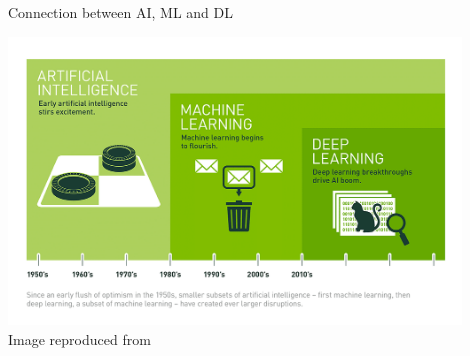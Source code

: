 \begin{frame}{Connection between AI, ML and DL}

    \begin{center}
        \includegraphics[width=0.90\textwidth]{./images/dl_intro/ai_ml_dl.png}\\
        {\scriptsize Image reproduced from \cite{NVidiaBlog:DifferenceBetweenAIMLDL}}\\
    \end{center}

\end{frame}
    
